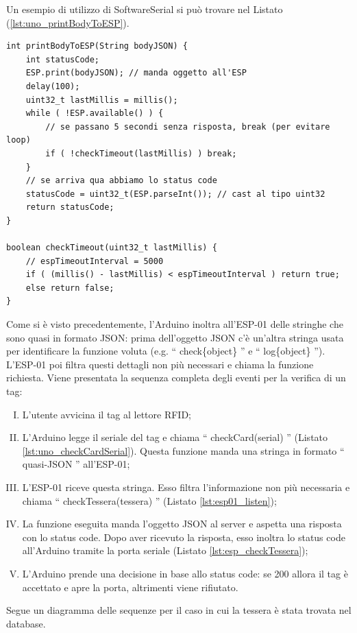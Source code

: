 \documentclass[12pt]{report}
\begin{document}
\noindent Un esempio di utilizzo di SoftwareSerial si può trovare nel Listato (\ref{lst:uno_printBodyToESP}).
\begin{lstlisting}[caption={La funzione printBodyToESP. Essa manda all'ESP-01 (tramite l'oggetto SoftwareSerial) la stringa ricevuta tra gli argomenti e poi aspetta per la risposta. Dopo aver ricevuto la risposta restituisce statusCode.}, label={lst:uno_printBodyToESP}]
int printBodyToESP(String bodyJSON) {
	int statusCode;
	ESP.print(bodyJSON); // manda oggetto all'ESP
	delay(100);
	uint32_t lastMillis = millis();
	while ( !ESP.available() ) {
		// se passano 5 secondi senza risposta, break (per evitare loop)
		if ( !checkTimeout(lastMillis) ) break;
	}
	// se arriva qua abbiamo lo status code
	statusCode = uint32_t(ESP.parseInt()); // cast al tipo uint32
	return statusCode;
}

boolean checkTimeout(uint32_t lastMillis) {
	// espTimeoutInterval = 5000
	if ( (millis() - lastMillis) < espTimeoutInterval ) return true;
	else return false;
}
\end{lstlisting}

Come si è visto precedentemente, l'Arduino inoltra all'ESP-01 delle stringhe che sono quasi in formato JSON: prima dell'oggetto JSON c'è un'altra stringa usata per identificare la funzione voluta (e.g$.$ \textquotedblleft{} check\{object\} \textquotedblright{} e \textquotedblleft{} log\{object\} \textquotedblright{}). L'ESP-01 poi filtra questi dettagli non più necessari e chiama la funzione richiesta.
 Viene presentata la sequenza completa degli eventi per la verifica di un tag:

\begin{enumerate}[(I)]
	\item L'utente avvicina il tag al lettore RFID;
	\item L'Arduino legge il seriale del tag e chiama \textquotedblleft{} checkCard(serial) \textquotedblright{} (Listato \ref{lst:uno_checkCardSerial}). Questa funzione manda una stringa in formato \textquotedblleft{} quasi-JSON \textquotedblright{} all'ESP-01;
	\item L'ESP-01 riceve questa stringa. Esso filtra l'informazione non più necessaria e chiama \textquotedblleft{} checkTessera(tessera) \textquotedblright{} (Listato \ref{lst:esp01_listen});
	\item La funzione eseguita manda l'oggetto JSON al server e aspetta una risposta con lo status code. Dopo aver ricevuto la risposta, esso inoltra lo status code all'Arduino tramite la porta seriale (Listato \ref{lst:esp_checkTessera});
	\item L'Arduino prende una decisione in base allo status code: se 200 allora il tag è accettato e apre la porta, altrimenti viene rifiutato.
\end{enumerate}
Segue un diagramma delle sequenze per il caso in cui la tessera è stata trovata nel database.
\end{document}
